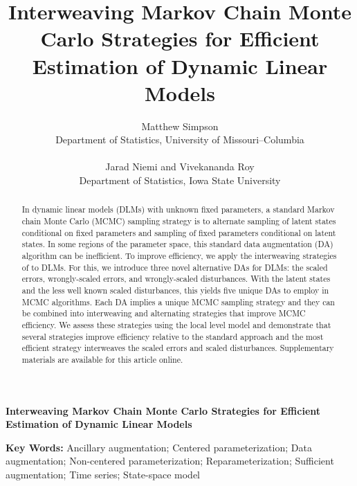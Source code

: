 \documentclass[12pt]{article}
\begin{document}
\def\spacingset#1{\renewcommand{\baselinestretch}%
{#1}\small\normalsize} \spacingset{1}
\setlength{\tabcolsep}{2pt}

\blind
{
  \title{\bf Interweaving Markov Chain Monte Carlo Strategies for Efficient
    Estimation of Dynamic Linear Models}
  \author{Matthew Simpson\\
    Department of Statistics, University of Missouri--Columbia\\~\\
    Jarad Niemi and Vivekananda Roy\\
    Department of Statistics, Iowa State University}
  \maketitle
} \fi

\blind
{
  \bigskip
  \bigskip
  \bigskip
  \begin{center}
    {\LARGE\bf Interweaving Markov Chain Monte Carlo Strategies for Efficient
    Estimation of Dynamic Linear Models}
\end{center}
  \medskip
} \fi

\bigskip


\begin{abstract}
In dynamic linear models (DLMs) with unknown fixed parameters, a standard Markov chain Monte Carlo (MCMC) sampling strategy is to alternate sampling of latent states conditional on fixed parameters and sampling of fixed parameters conditional on latent states. In some regions of the parameter space, this standard data augmentation (DA) algorithm can be inefficient. To improve efficiency, we apply the interweaving strategies of \citet{yu2011center} to DLMs. For this, we introduce three novel alternative DAs for DLMs: the scaled errors, wrongly-scaled errors, and wrongly-scaled disturbances. With the latent states and the less well known scaled disturbances, this yields five unique DAs to employ in MCMC algorithms. Each DA implies a unique MCMC sampling strategy and they can be combined into interweaving and alternating strategies that improve MCMC efficiency. We assess these strategies using the local level model and demonstrate that several strategies improve efficiency relative to the standard approach and the most efficient strategy interweaves the scaled errors and scaled disturbances. Supplementary materials are available for this article online.
\end{abstract}


\noindent%
{\bf Key Words:} Ancillary augmentation; Centered parameterization; Data augmentation; Non-centered parameterization; Reparameterization; Sufficient augmentation; Time series; State-space model
\end{document}
